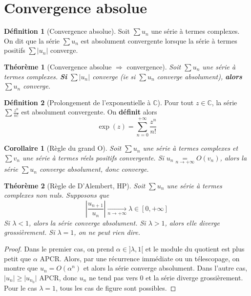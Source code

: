 \documentclass[french]{book}
\newcommand{\C}{\mathbb{C}}
\theoremstyle{plain}
\newtheorem{thm}{Théorème}[chapter]
\newtheorem{cor}{Corollaire}[chapter]
\theoremstyle{definition}
\newtheorem{dfn}{Définition}[chapter]
\theoremstyle{remark}
\begin{document}
\section{Convergence absolue}
\begin{dfn}[Convergence absolue]
	Soit $\displaystyle \sum u_n$ une série à termes complexes. On dit que la série $\displaystyle \sum u_n$ est absolument convergente lorsque la série à termes positifs $\displaystyle \sum \lvert u_n\rvert$ converge.
\end{dfn}
\begin{thm}[Convergence absolue $\Longrightarrow$ convergence]
	Soit $\displaystyle \sum u_n$ une série à termes complexes. \textbf{Si} $\displaystyle \sum \lvert u_n\rvert$ converge (ie si $\displaystyle \sum u_n$ converge absolument), \textbf{alors} $\displaystyle \sum u_n$ converge.
\end{thm}
\begin{dfn}[Prolongement de l'exponentielle à $\C$]
	Pour tout $z\in\C$, la série $\displaystyle \sum \frac{z^n}{n!}$ est absolument convergente. On \textbf{définit} alors $$\exp(z)=\sum_{n=0}^{+\infty}\frac{z^n}{n!}$$
\end{dfn}
\begin{cor}[Règle du grand O]
	Soit $\displaystyle \sum u_n$ une série à termes complexes et $\displaystyle \sum v_n$ une série à termes réels positifs convergente. Si $\displaystyle u_n\underset{n\to+\infty}{=}O(v_n)$, alors la série $\displaystyle \sum u_n$ converge absolument, donc converge.
\end{cor}
\begin{thm}[Règle de D'Alembert, HP]
	Soit $\displaystyle \sum u_n$ une série à termes complexes non nuls. Supposons que $$\left\lvert\frac{u_{n+1}}{u_n}\right\rvert\xrightarrow[n\to+\infty]{}\lambda\in[0,+\infty]$$ Si $\lambda<1$, alors la série converge absolument. Si $\lambda>1$, alors elle diverge grossièrement. Si $\lambda=1$, on ne peut rien dire.
\end{thm}
\begin{proof}
	Dans le premier cas, on prend $\alpha\in]\lambda,1[$ et le module du quotient est plus petit que $\alpha$ APCR. Alors, par une récurrence immédiate ou un télescopage, on montre que $u_n=O(\alpha^n)$ et alors la série converge absolument. Dans l'autre cas, $\lvert u_n\rvert \geqslant\lvert u_{n_0}\rvert$ APCR, donc $u_n$ ne tend pas vers $0$ et la série diverge grossièrement. Pour le cas $\lambda=1$, tous les cas de figure sont possibles.
\end{proof}
\end{document}

